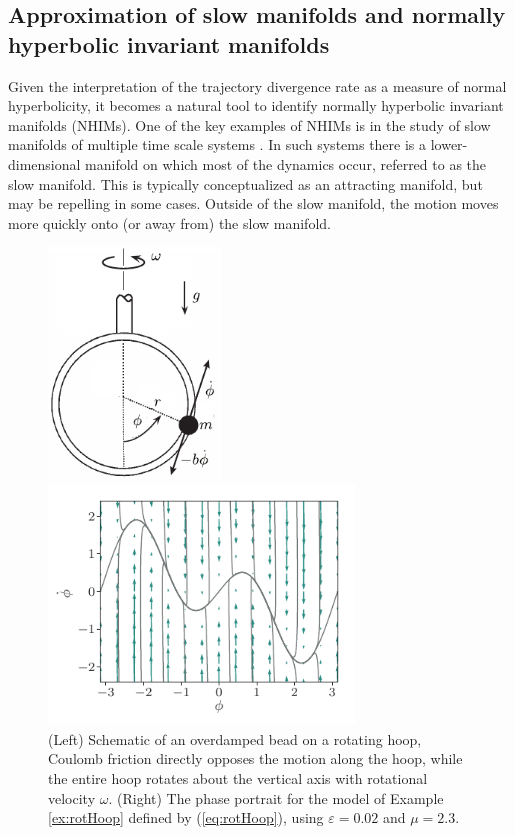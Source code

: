 \documentclass[twocolumn]{svjour3}
\begin{document}
\subsection{Approximation of slow manifolds and normally hyperbolic invariant manifolds}\label{ss:Application-SlowMnflds}
Given the interpretation of the trajectory divergence rate as a measure of normal hyperbolicity, it becomes a natural tool to identify normally hyperbolic invariant manifolds (NHIMs). One of the key examples of NHIMs is in the study of slow manifolds of multiple time scale systems \cite{kuehn2016multiple}. In such systems there is a lower-dimensional manifold on which most of the dynamics occur, referred to as the slow manifold. This is typically conceptualized as an attracting manifold, but may be repelling in some cases. Outside of the slow manifold, the motion moves more quickly onto (or away from) the slow manifold. %

\begin{figure}
\begin{minipage}{3.2in}
\centering
\includegraphics[width=1.8in]{Fig6}
\end{minipage}
\begin{minipage}{3.2in}
\centering
\includegraphics[width=3.2in]{Fig7}
\end{minipage}
\caption{\label{fig:rotHoopA} (Left) Schematic of an overdamped bead on a rotating hoop, Coulomb friction directly opposes the motion along the hoop, while the entire hoop rotates about the vertical axis with rotational velocity $\omega$. (Right) The phase portrait for the model of Example \ref{ex:rotHoop} defined by (\ref{eq:rotHoop}), using $\varepsilon = 0.02$ and $\mu = 2.3$.}
\end{figure}
\end{document}
